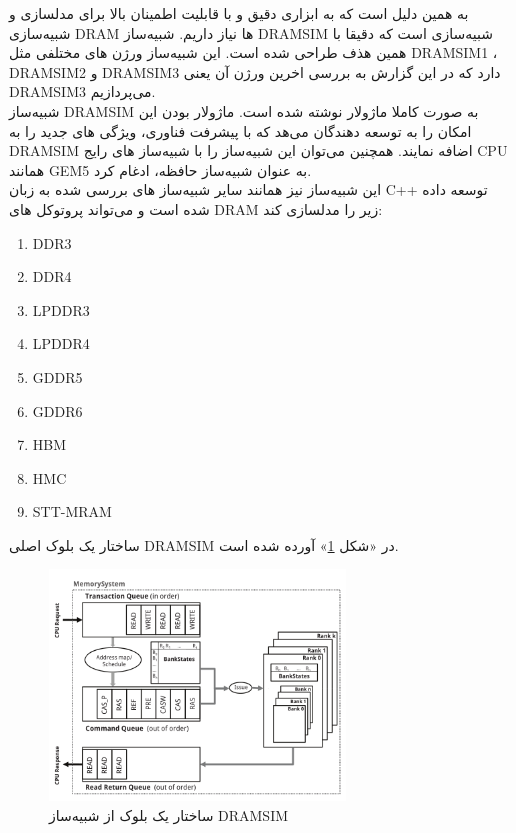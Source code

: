 \documentclass[12pt]{exam}
\begin{document}
\begin{questions}
به همین دلیل است که به ابزاری دقیق و با قابلیت اطمینان بالا برای مدلسازی و شبیه‌سازی DRAM ها نیاز داریم. شبیه‌ساز DRAMSIM شبیه‌سازی است که دقیقا با همین هذف طراحی شده است. این شبیه‌ساز ورژن های مختلفی مثل DRAMSIM1 ، DRAMSIM2 و DRAMSIM3 دارد که در این گزارش به بررسی اخرین ورژن آن یعنی DRAMSIM3 می‌پردازیم.\\

شبیه‌ساز DRAMSIM به صورت کاملا ماژولار نوشته شده است. ماژولار بودن این امکان را به توسعه دهندگان می‌هد که با پیشرفت فناوری، ویژگی های جدید را به DRAMSIM اضافه نمایند. همچنین می‌توان این شبیه‌ساز را با شبیه‌ساز های رایج CPU همانند GEM5 به عنوان شبیه‌ساز حافظه، ادغام کرد.\\ 

این شبیه‌ساز نیز همانند سایر شبیه‌ساز های بررسی شده به زبان C++ توسعه داده شده است و می‌تواند پروتوکل های DRAM زیر را مدلسازی کند:

\begin{latin}
	\begin{enumerate}
		\item DDR3
		\item DDR4
		\item LPDDR3
		\item LPDDR4
		\item GDDR5
		\item GDDR6
		\item HBM
		\item HMC
		\item STT-MRAM
	\end{enumerate} 
\end{latin}

ساختار یک بلوک اصلی DRAMSIM در «شکل \textcolor{blue}{\ref{ساختار یک بلوک از شبیه‌ساز DRAMSIM}}» آورده شده است.
\begin{figure}[h]
	\centering
	\includegraphics[width=0.7\textwidth]{images/img11}
	\caption{ساختار یک بلوک از شبیه‌ساز DRAMSIM}
	\label{ساختار یک بلوک از شبیه‌ساز DRAMSIM}
\end{figure}



\end{questions}
\end{document}

